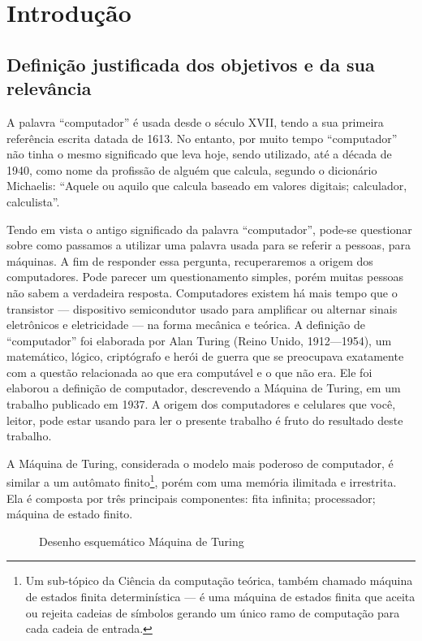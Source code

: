 \section{Introdução} 
\subsection{Definição justificada dos objetivos e da sua relevância}
A palavra ``computador'' é usada desde o século XVII, tendo a sua primeira referência escrita datada de 1613. No entanto, por muito tempo ``computador'' não tinha o mesmo significado que leva hoje, sendo utilizado, até a década de 1940, como nome da profissão de alguém que calcula, segundo o dicionário Michaelis: ``Aquele ou aquilo que calcula baseado em valores digitais; calculador, calculista''. \cite{4}

Tendo em vista o antigo significado da palavra ``computador'', pode-se questionar sobre como passamos a utilizar uma palavra usada para se referir a pessoas, para máquinas. A fim de responder essa pergunta, recuperaremos a origem dos computadores. Pode parecer um questionamento simples, porém muitas pessoas não sabem a verdadeira resposta. Computadores existem há mais tempo que o transistor — dispositivo semicondutor usado para amplificar ou alternar sinais eletrônicos e eletricidade — na forma mecânica e teórica. A definição de ``computador'' foi elaborada por Alan Turing (Reino Unido, 1912—1954), um matemático, lógico, criptógrafo e herói de guerra que se preocupava exatamente com a questão relacionada ao que era computável e o que não era. Ele foi elaborou a definição de computador, descrevendo a Máquina de Turing, em um trabalho publicado em 1937. A origem dos computadores e celulares que você, leitor, pode estar usando para ler o presente trabalho é fruto do resultado deste trabalho.

A Máquina de Turing, considerada o modelo mais poderoso de computador, é similar a um autômato finito\footnote{Um sub-tópico da Ciência da computação teórica, também chamado máquina de estados finita determinística — é uma máquina de estados finita que aceita ou rejeita cadeias de símbolos gerando um único ramo de computação para cada cadeia de entrada.}, porém com uma memória ilimitada e irrestrita. Ela é composta por três principais componentes: fita infinita; processador; máquina de estado finito.

\vspace{1cm}
\begin{figure}[H] \centering 
  \caption{\label{fig:1} Desenho esquemático Máquina de Turing} 
\end{figure}


